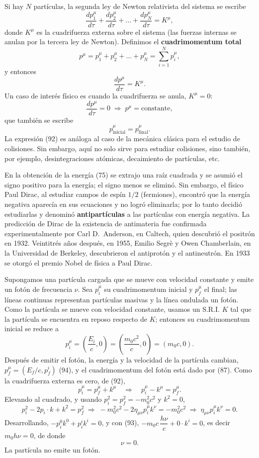 Si hay $N$ partículas, la segunda ley de Newton relativista del sistema
se escribe
\[
\frac{dp^\mu_1}{d\tau}+\frac{dp^\mu_2}{d\tau}+\dots+\frac{dp^\mu_N}
{d\tau} = K^\mu, \tag{88}
\]
donde $K^\mu$ es la cuadrifuerza externa sobre el sistema (las fuerzas
internas se anulan por la tercera ley de Newton). Definimos el
\textbf{cuadrimomentum total}
\[
p^\mu = p^\mu_1+p^\mu_2+\dots+p^\mu_N = \sum_{i=1}^Np^\mu_i, \tag{89}
\]
y entonces
\[
\frac{dp^\mu}{d\tau} = K^\mu . \tag{90}
\]
Un caso de interés físico es cuando la cuadrifuerza se anula, $K^\mu=0$:
\[
\frac{dp^\mu}{d\tau}=0 \;\Rightarrow\; p^\mu=\text{constante}, \tag{91}
\]
que también se escribe
\[
p^\mu_{\text{inicial}} = p^\mu_{\text{final}} . \tag{92}
\]
La expresión (92) es análoga al caso de la mecánica clásica para el
estudio de colisiones. Sin embargo, aquí no solo sirve para estudiar
colisiones, sino también, por ejemplo, desintegraciones atómicas,
decaimiento de partículas, etc.

\begin{observacion}[Antipartículas]
En la obtención de la energía (75) se extrajo una raíz cuadrada y se
asumió el signo positivo para la energía; el signo menos se eliminó. Sin
embargo, el físico Paul Dirac, al estudiar campos de espín $1/2$
(fermiones), encontró que la energía negativa aparecía en sus ecuaciones
y no logró eliminarla; por lo tanto decidió estudiarlas y denominó
\textbf{antipartículas} a las partículas con energía negativa. La
predicción de Dirac de la existencia de antimateria fue confirmada
experimentalmente por Carl D.~Anderson, en Caltech, quien descubrió el
positrón en 1932. Veintitrés años después, en 1955, Emilio Segrè y Owen
Chamberlain, en la Universidad de Berkeley, descubrieron el antiprotón y
el antineutrón. En 1933 se otorgó el premio Nobel de física a Paul
Dirac.
\end{observacion}

\begin{ejemplo}
Supongamos una partícula cargada que se mueve con velocidad constante y
emite un fotón de frecuencia $\nu$. Sea $p^\mu_i$ su cuadrimomentum
inicial y $p^\mu_f$ el final; las líneas continuas representan
partículas masivas y la línea ondulada un fotón. Como la partícula se
mueve con velocidad constante, usamos un S.R.I. $K$ tal que la partícula
se encuentra en reposo respecto de $K$; entonces su cuadrimomentum
inicial se reduce a
\[
p^\mu_i = \left(\frac{E_i}{c},0\right) = \left(\frac{m_0c^2}{c},0\right)
= (m_0c,0). \tag{93}
\]
Después de emitir el fotón, la energía y la velocidad de la partícula
cambian, $p^\mu_f=(E_f/c,p^i_f)$ (94), y el cuadrimomentum del fotón está
dado por (87). Como la cuadrifuerza externa es cero, de (92),
\[
p^\mu_i = p^\mu_f+k^\mu \quad\Longrightarrow\quad p^\mu_i-k^\mu =
p^\mu_f . \tag{95, 96}
\]
Elevando al cuadrado, y usando $p_i^2=p_f^2=-m_0^2c^2$ y $k^2=0$,
\[
p_i^2-2p_i\cdot k+k^2=p_f^2 \;\Rightarrow\; -m_0^2c^2-2\eta_{\mu\nu}
p^\mu_ik^\nu = -m_0^2c^2 \;\Rightarrow\; \eta_{\mu\nu}p^\mu_ik^\nu=0 .
\]
Desarrollando, $-p^0_ik^0+p^i_ik^i=0$, y con (93),
$-m_0c\,\dfrac{h\nu}{c}+0\cdot k^i=0$, es decir $m_0h\nu=0$, de donde
\[
\nu = 0 .
\]
La partícula no emite un fotón.
\end{ejemplo}

